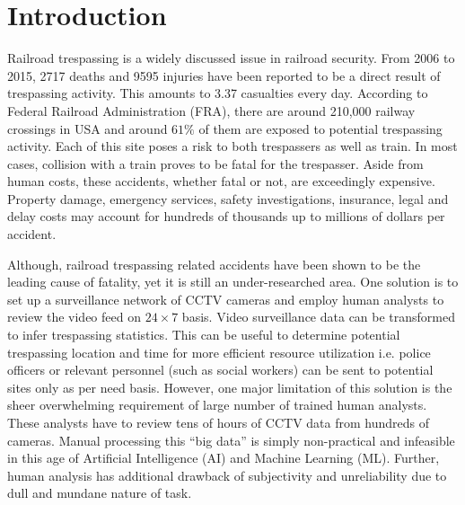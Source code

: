 \section{Introduction}
Railroad trespassing is a widely discussed issue in railroad security. From 2006 to 2015, 2717 deaths and 9595 injuries have been reported to be a direct result of trespassing activity\cite{zhang2018automated}. This amounts to 3.37 casualties every day. According to Federal Railroad Administration (FRA), there are around 210,000 railway crossings in USA and around $61\%$ of them are exposed to potential trespassing activity\cite{zhang2018automated}. Each of this site poses a risk to both trespassers as well as train. In most cases, collision with a train proves to be fatal for the trespasser. Aside from human costs, these accidents, whether fatal or not, are exceedingly expensive. Property damage, emergency services, safety investigations, insurance, legal and delay costs may account for hundreds of thousands up to millions of dollars per accident\cite{goldberg1998train}. 

Although, railroad trespassing related accidents have been shown to be the leading cause of fatality\cite{pelletier1997deaths,matzopoulos1998hours,lobb2003evaluation,evans2003accidental}, yet it is still an under-researched area\cite{lobb2006trespassing}. One solution is to set up a surveillance network of CCTV cameras and employ human analysts to review the video feed on $24 \times 7$
basis. Video surveillance data can be transformed to infer trespassing statistics. This can be useful to determine potential trespassing location and time for more efficient resource utilization i.e. police officers or relevant personnel (such as social workers) can be sent to potential sites only as per need basis. However, one major limitation of this solution is the sheer overwhelming requirement of large number of trained human analysts. These analysts have to review tens of hours of CCTV data from hundreds of cameras. Manual processing this ``big data'' is simply non-practical and infeasible in this age of Artificial Intelligence (AI) and Machine Learning (ML). Further, human analysis has additional drawback of subjectivity and unreliability due to dull and mundane nature of task\cite{norouznezhad2008high}.

